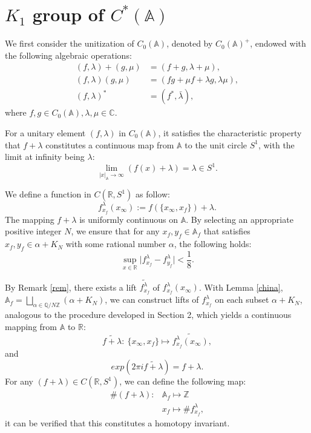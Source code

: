 \documentclass[11pt]{article}
\newcommand{\CA}{C_0(\mathbb{A})}
\newcommand{\sectwo}{Section 2}
\newcommand{\A}{\mathbb{A}}
\theoremstyle{remark}
\begin{document}
\section{$K_1$ group of $C^\ast(\mathbb{A})$}
We first consider the unitization of \( C_0(\mathbb{A}) \), denoted by \( C_0(\mathbb{A})^+\), endowed with the following algebraic operations:
\begin{align*}
    (f , \lambda) + (g , \mu) &= (f+g , \lambda+\mu), \\
    (f , \lambda)(g , \mu) &= (fg + \mu f + \lambda g, \lambda\mu),\\
    (f , \lambda)^*&=(f^* , \bar{\lambda}),
\end{align*}
where \(f,g \in C_0(\A), \lambda,\mu\in \mathbb{C}.\)

For a unitary element \((f, \lambda)\) in \(\CA\), it satisfies the characteristic property that
\( f + \lambda \) constitutes a continuous map from \(\A\) to the unit circle \(S^1\), 
with the limit at infinity being \(\lambda\):
\[
\lim_{\rvert x\lvert_{\A} \to \infty} (f(x) + \lambda) = \lambda \in S^1.
\]

We define a function in $C(\mathbb{R},S^1)$ as follow:
\[
f^\lambda_{x_f}(x_\infty):=f(\{x_\infty,x_f\}) + \lambda.
\]
The mapping \( f + \lambda \) is uniformly continuous on \( \A \). By selecting an appropriate positive integer \( N \), we ensure that for any \( x_f, y_f \in \A_f \) that satisfies \( x_f, y_f \in \alpha + K_N \) with some rational number \( \alpha \), the following holds:
\[
\sup_{x\in \mathbb{R}}\lvert f^\lambda_{x_f}-f^\lambda_{y_f}\rvert<\frac{1}{8}.
\]

By Remark \ref{rem}, there exists a lift \(\widetilde{f^\lambda_{x_f}}\) of \(f^\lambda_{x_f}(x_\infty)\). With Lemma \ref{china}, \(\A_f = \bigsqcup_{\alpha\in \mathbb{Q}/N\mathbb{Z}} \left( \alpha + K_N\right)\), 
we can construct lifts of \( f^\lambda_{x_f} \) on each subset \(\alpha+K_N\), analogous to the procedure developed in \sectwo, which yields a continuous mapping from \(\A\) to \(\mathbb{R}\):
\[
\widetilde{f+\lambda}:\ \{x_\infty,x_f\}\mapsto\widetilde{f^\lambda_{x_f}(x_\infty)},
\]
and
\[
exp(2\pi i\widetilde{f+\lambda})=f+\lambda.
\]
For any \((f+\lambda)\in C(\mathbb{R},S^1)\), we can define the following map:
\begin{align}
    \#(f+\lambda):&\A_f\mapsto \mathbb{Z}\\
                  &x_f\mapsto\#f^\lambda_{x_f},
\end{align}
it can be verified that this constitutes a homotopy invariant.
\end{document}
